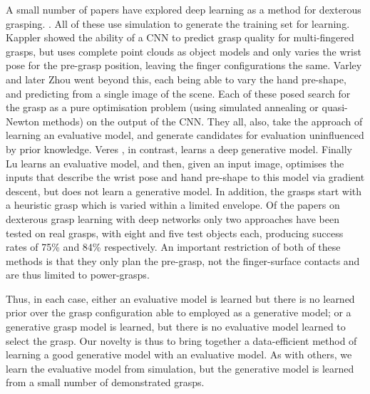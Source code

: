 A small number of papers have explored deep learning as a method for dexterous grasping. \cite{lu2017planning,varley2015generating,veres2017modeling,zhou20176dof,kappler2015leveraging}. All of these use simulation to generate the training set for learning. Kappler \cite{kappler2015leveraging} showed the ability of a CNN to predict grasp quality for multi-fingered grasps, but uses complete point clouds as object models and only varies the wrist pose for the pre-grasp position, leaving the finger configurations the same. Varley \cite{varley2015generating} and later Zhou \cite{zhou20176dof} went beyond this, each being able to vary the hand pre-shape, and predicting from a single image of the scene. Each of these posed search for the grasp as a pure optimisation problem (using simulated annealing or quasi-Newton methods) on the output of the CNN. They all, also, take the approach of learning an evaluative model, and generate candidates for evaluation uninfluenced by prior knowledge. Veres \cite{veres2017modeling}, in contrast, learns a deep generative model. Finally Lu \cite{lu2017planning} learns an evaluative model, and then, given an input image, optimises the inputs that describe the wrist pose and hand pre-shape to this model via gradient descent, but does not learn a generative model. In addition, the grasps start with a heuristic grasp which is varied within a limited envelope. Of the papers on dexterous grasp learning with deep networks only two approaches \cite{varley2015generating,lu2017planning} have been tested on real grasps, with eight and five test objects each, producing success rates of 75\% and 84\% respectively. An important restriction of both of these methods is that they only plan the pre-grasp, not the finger-surface contacts and are thus limited to power-grasps.

Thus, in each case, either an evaluative model is learned but there is no learned prior over the grasp configuration able to employed as a generative model; or a generative grasp model is learned, but there is no evaluative model learned to select the grasp. Our novelty is thus to bring together a data-efficient method of learning a good generative model with an evaluative model. As with others, we learn the evaluative model from simulation, but the generative model is learned from a small number of demonstrated grasps. 


